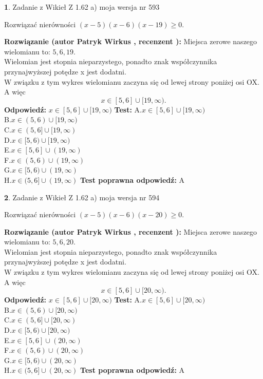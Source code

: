 \documentclass[12pt, a4paper]{article}
\theoremstyle{definition} %
\newtheorem{zad}{}
\newcommand{\zadStart}[1]{\begin{zad}#1\newline}
\newcommand{\zadStop}{\end{zad}}
\newcommand{\rozwStart}[2]{\noindent \textbf{Rozwiązanie (autor #1 , recenzent #2): }\newline}
\newcommand{\rozwStop}{\newline}
\newcommand{\odpStart}{\noindent \textbf{Odpowiedź:}\newline}
\newcommand{\odpStop}{\newline}
\newcommand{\testStart}{\noindent \textbf{Test:}\newline}
\newcommand{\testStop}{\newline}
\newcommand{\kluczStart}{\noindent \textbf{Test poprawna odpowiedź:}\newline}
\newcommand{\kluczStop}{\newline}
\begin{document}
\zadStart{Zadanie z Wikieł Z 1.62 a) moja wersja nr 593}

Rozwiązać nierówności $(x-5)(x-6)(x-19)\ge0$.
\zadStop
\rozwStart{Patryk Wirkus}{}
Miejsca zerowe naszego wielomianu to: $5, 6, 19$.\\
Wielomian jest stopnia nieparzystego, ponadto znak współczynnika przy\linebreak najwyższej potędze x jest dodatni.\\ W związku z tym wykres wielomianu zaczyna się od lewej strony poniżej osi OX. A więc $$x \in [5,6] \cup [19,\infty).$$
\rozwStop
\odpStart
$x \in [5,6] \cup [19,\infty)$
\odpStop
\testStart
A.$x \in [5,6] \cup [19,\infty)$\\
B.$x \in (5,6) \cup [19,\infty)$\\
C.$x \in (5,6] \cup [19,\infty)$\\
D.$x \in [5,6) \cup [19,\infty)$\\
E.$x \in [5,6] \cup (19,\infty)$\\
F.$x \in (5,6) \cup (19,\infty)$\\
G.$x \in [5,6) \cup (19,\infty)$\\
H.$x \in (5,6] \cup (19,\infty)$
\testStop
\kluczStart
A
\kluczStop



\zadStart{Zadanie z Wikieł Z 1.62 a) moja wersja nr 594}

Rozwiązać nierówności $(x-5)(x-6)(x-20)\ge0$.
\zadStop
\rozwStart{Patryk Wirkus}{}
Miejsca zerowe naszego wielomianu to: $5, 6, 20$.\\
Wielomian jest stopnia nieparzystego, ponadto znak współczynnika przy\linebreak najwyższej potędze x jest dodatni.\\ W związku z tym wykres wielomianu zaczyna się od lewej strony poniżej osi OX. A więc $$x \in [5,6] \cup [20,\infty).$$
\rozwStop
\odpStart
$x \in [5,6] \cup [20,\infty)$
\odpStop
\testStart
A.$x \in [5,6] \cup [20,\infty)$\\
B.$x \in (5,6) \cup [20,\infty)$\\
C.$x \in (5,6] \cup [20,\infty)$\\
D.$x \in [5,6) \cup [20,\infty)$\\
E.$x \in [5,6] \cup (20,\infty)$\\
F.$x \in (5,6) \cup (20,\infty)$\\
G.$x \in [5,6) \cup (20,\infty)$\\
H.$x \in (5,6] \cup (20,\infty)$
\testStop
\kluczStart
A
\kluczStop
\end{document}
